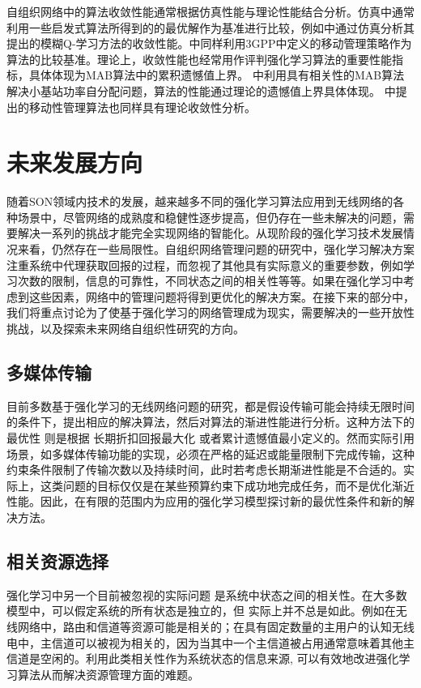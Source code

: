 \documentclass{IEEEtran}
\begin{document}
自组织网络中的算法收敛性能通常根据仿真性能与理论性能结合分析。仿真中通常利用一些启发式算法所得到的的最优解作为基准进行比较，例如\cite{Razavi2010a}中通过仿真分析其提出的模糊Q-学习方法的收敛性能。\cite{Simsek2015a}中同样利用3GPP中定义的移动管理策略作为算法的比较基准。理论上，收敛性能也经常用作评判强化学习算法的重要性能指标，具体体现为MAB算法中的累积遗憾值上界。\cite{Wang2017} 中利用具有相关性的MAB算法解决小基站功率自分配问题，算法的性能通过理论的遗憾值上界具体体现。\cite{Shen2016} 中提出的移动性管理算法也同样具有理论收敛性分析。

\section{未来发展方向}
\label{sec:FutureWork}


随着SON领域内技术的发展，越来越多不同的强化学习算法应用到无线网络的各种场景中，尽管网络的成熟度和稳健性逐步提高，但仍存在一些未解决的问题，需要解决一系列的挑战才能完全实现网络的智能化。从现阶段的强化学习技术发展情况来看，仍然存在一些局限性。自组织网络管理问题的研究中，强化学习解决方案注重系统中代理获取回报的过程，而忽视了其他具有实际意义的重要参数，例如学习次数的限制，信息的可靠性，不同状态之间的相关性等等。如果在强化学习中考虑到这些因素，网络中的管理问题将得到更优化的解决方案。在接下来的部分中，我们将重点讨论为了使基于强化学习的网络管理成为现实，需要解决的一些开放性挑战，以及探索未来网络自组织性研究的方向。

\subsection{多媒体传输}

目前多数基于强化学习的无线网络问题的研究，都是假设传输可能会持续无限时间的条件下，提出相应的解决算法，然后对算法的渐进性能进行分析。这种方法下的最优性 则是根据 长期折扣回报最大化 或者累计遗憾值最小定义的。然而实际引用场景，如多媒体传输功能的实现，必须在严格的延迟或能量限制下完成传输，这种约束条件限制了传输次数以及持续时间，此时若考虑长期渐进性能是不合适的。实际上，这类问题的目标仅仅是在某些预算约束下成功地完成任务，而不是优化渐近性能。因此，在有限的范围内为应用的强化学习模型探讨新的最优性条件和新的解决方法。


\subsection{相关资源选择}
强化学习中另一个目前被忽视的实际问题 是系统中状态之间的相关性。在大多数模型中，可以假定系统的所有状态是独立的，但 实际上并不总是如此。例如在无线网络中，路由和信道等资源可能是相关的；在具有固定数量的主用户的认知无线电中，主信道可以被视为相关的，因为当其中一个主信道被占用通常意味着其他主信道是空闲的。利用此类相关性作为系统状态的信息来源, 可以有效地改进强化学习算法从而解决资源管理方面的难题。
\end{document}
